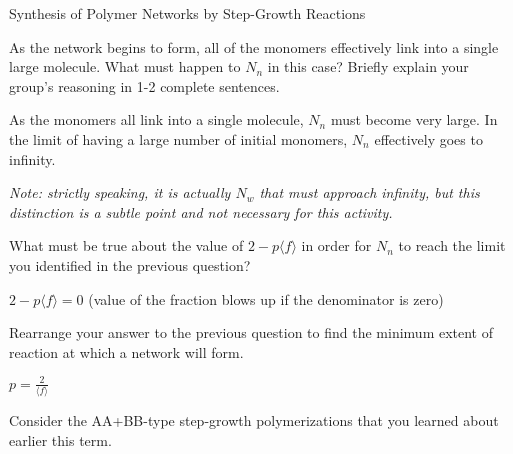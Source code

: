 \begin{activity}[extension]{Synthesis of Polymer Networks by Step-Growth Reactions}
\begin{ctqs}
	\question As the network begins to form, all of the monomers effectively link into a single large molecule.  What must happen to $N_n$ in this case?  Briefly explain your group's reasoning in 1-2 complete sentences.
	
		\begin{solution}[1.5in]{}
			As the monomers all link into a single molecule, $N_n$ must become very large.  In the limit of having a large number of initial monomers, $N_n$ effectively goes to infinity.
			
			\emph{Note: strictly speaking, it is actually $N_w$ that must approach infinity, but this distinction is a subtle point and not necessary for this activity.}
		\end{solution}
	
	\question What must be true about the value of $2-p\langle f \rangle$ in order for $N_n$ to reach the limit you identified in the previous question?
	
		\begin{solution}[1.5in]{}
			$2-p\langle f\rangle = 0$ (value of the fraction blows up if the denominator is zero)
		\end{solution}
	
	\question Rearrange your answer to the previous question to find the minimum extent of reaction at which a network will form.
	
		\begin{solution}[1.25in]{}
			$p = \frac{2}{\langle f \rangle}$
		\end{solution}
\end{ctqs}


\begin{exercises}

	
	
	
	\exercise Consider the AA+BB-type step-growth polymerizations that you learned about earlier this term.
	

\end{exercises}
\end{activity}
